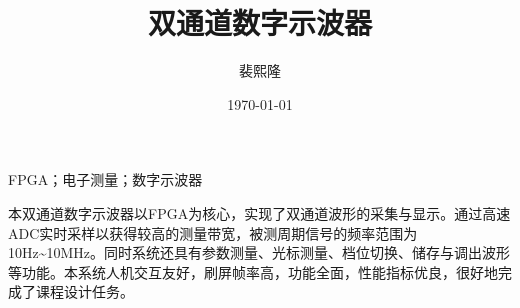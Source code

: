 \documentclass[supercite]{HustGraduPaper}
\title{双通道数字示波器} %
\author{裴熙隆} %
\date{\today} %
\begin{document}
	\maketitle
	
	
	\clearpage %
	
	\begin{cnabstract}{FPGA；电子测量；数字示波器}
		
		本双通道数字示波器以FPGA为核心，实现了双通道波形的采集与显示。通过高速ADC实时采样以获得较高的测量带宽，被测周期信号的频率范围为10Hz\textasciitilde10MHz。同时系统还具有参数测量、光标测量、档位切换、储存与调出波形等功能。本系统人机交互友好，刷屏帧率高，功能全面，性能指标优良，很好地完成了课程设计任务。		
		
		
	\end{cnabstract}

%		
%		
	
\end{document}
